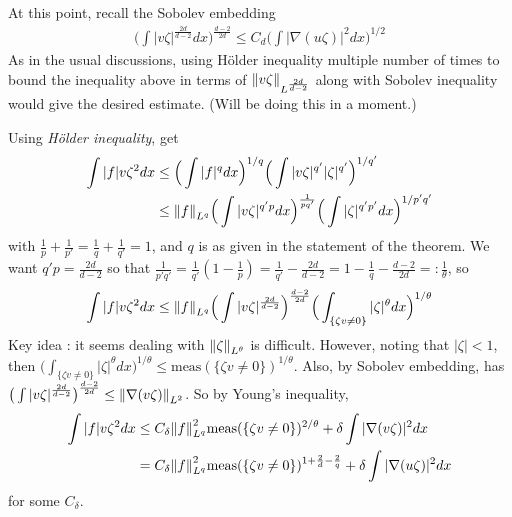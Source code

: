 \documentclass[12pt,a4paper]{article}
\newenvironment{proof}
{\begin{changemargin}{0.5cm}{0.5cm} 
	}%
	{\end{changemargin}
}
\newenvironment{p}
{\begin{proof} 
	}%
	{\end{proof}
}
\begin{document}
\begin{p}
At this point, recall the Sobolev embedding 
\begin{align*}
\Big( \int |v\zeta|^{\frac{2d}{d-2}} dx\Big)^{\frac{d-2}{2d}} \leq C_d \Big( \int |\nabla(u\zeta)|^2 dx \Big)^{1/2}
\end{align*}
As in the usual discussions, using H\"older inequality multiple number of times to bound the inequality above in terms of $\snorms{v\zeta}{L^{\frac{2d}{d-2}}}$ along with Sobolev inequality would give the desired estimate. (Will be doing this in a moment.)
\s

Using \emph{H\"older inequality}, get
\begin{align*}
\int |f| v\zeta^2 dx & \leq \Big( \int |f|^q dx\Big)^{1/q}\Big( \int |v \zeta|^{q'} |\zeta|^{q'} \Big)^{1/q'} \\
& \leq \snorms{f}{L^q} \Big( \int |v\zeta|^{q'p} dx \Big)^{\frac{1}{pq'}} \Big( \int |\zeta|^{q'p'} dx \Big)^{1/p'q'}
\end{align*}
with $\frac{1}{p}+ \frac{1}{p'} = \frac{1}{q} + \frac{1}{q'} =1$, and $q$ is as given in the statement of the theorem. We want $q'p = \frac{2d}{d-2}$ so that $\frac{1}{p'q'} = \frac{1}{q'}(1- \frac{1}{p}) = \frac{1}{q'} - \frac{2d}{d-2} = 1- \frac{1}{q}- \frac{d-2}{2d} =: \frac{1}{\theta}$, so
\begin{align*}
\int |f|v \zeta^2 dx \leq \snorms{f}{L^q} \Big( \int |v\zeta|^{\frac{2d}{d-2}} \Big)^{\frac{d-2}{2d}} \Big( \int_{\{\zeta v\neq 0\}} |\zeta|^{\theta} dx \Big)^{1/\theta}
\end{align*} 
Key idea : it seems dealing with $\snorms{\zeta}{L^{\theta}}$ is difficult. However, noting that $|\zeta| <1$, then $\big( \int_{\{\zeta v\neq 0\}} |\zeta|^{\theta} dx \big)^{1/\theta} \leq \text{meas}(\{\zeta v\neq 0\})^{1/\theta}$. Also, by Sobolev embedding, has $\big( \int |v\zeta|^{\frac{2d}{d-2}} \big)^{\frac{d-2}{2d}} \leq \snorms{\nabla(v\zeta)}{L^2}$. So by Young's inequality,
\begin{align*}
\int |f|v \zeta^2 dx & \leq C_{\delta} \snorms{f}{L^q}^2 \text{meas}(\{\zeta v\neq 0\})^{2/\theta} + \delta \int |\nabla (v\zeta)|^2 dx \\
& = C_{\delta} \snorms{f}{L^q}^2 \text{meas}(\{\zeta v\neq 0\})^{1+ \frac{2}{d} - \frac{2}{q}} + \delta \int |\nabla(u\zeta)|^2 dx 
\end{align*}
for some $C_{\delta}$.
\s


\end{p}
\end{document}
